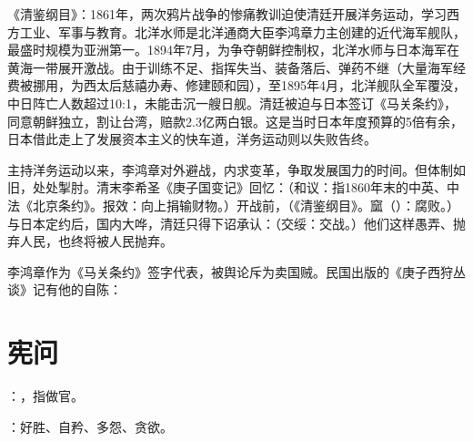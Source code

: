 {
《清鉴纲目》：1861年，两次鸦片战争的惨痛教训迫使清廷开展洋务运动，学习西方工业、军事与教育。北洋水师是北洋通商大臣李鸿章力主创建的近代海军舰队，最盛时规模为亚洲第一。1894年7月，为争夺朝鲜控制权，北洋水师与日本海军在黄海一带展开激战。由于训练不足、指挥失当、装备落后、弹药不继（大量海军经费被挪用，为西太后慈禧办寿、修建颐和园），至1895年4月，北洋舰队全军覆没，中日阵亡人数超过10:1，未能击沉一艘日舰。清廷被迫与日本签订《马关条约》，同意朝鲜独立，割让台湾，赔款2.3亿两白银。这是当时日本年度预算的5倍有余，日本借此走上了发展资本主义的快车道，洋务运动则以失败告终。

主持洋务运动以来，李鸿章对外避战，内求变革，争取发展国力的时间。但体制如旧，处处掣肘。清末李希圣《庚子国变记》回忆：（和议：指1860年末的中英、中法《北京条约》。报效：向上捐输财物。）开战前，（《清鉴纲目》。窳（）：腐败。）与日本定约后，国内大哗，清廷只得下诏承认：（交绥：交战。）他们这样愚弄、抛弃人民，也终将被人民抛弃。

李鸿章作为《马关条约》签字代表，被舆论斥为卖国贼。民国出版的《庚子西狩丛谈》记有他的自陈：
}



\chapter{宪问}

{
\item {}：，指做官。
\item {}：好胜、自矜、多怨、贪欲。
}
{}


